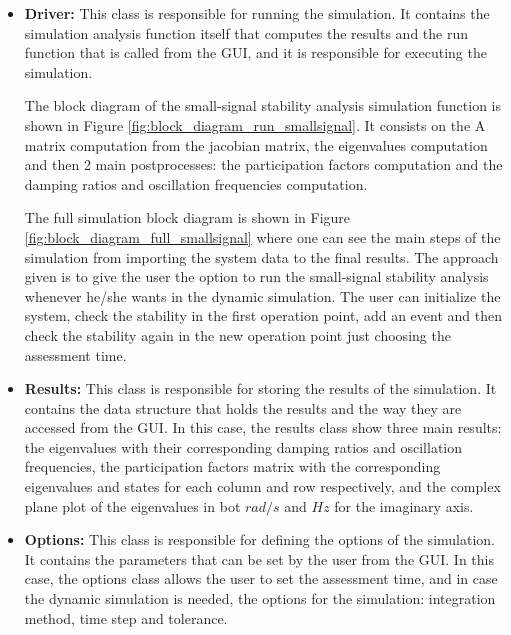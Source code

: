 \begin{itemize}
    \item \textbf{Driver:} This class is responsible for running the simulation. It contains the simulation analysis function itself
    that computes the results and the run function that is called from the GUI, and it is responsible for executing the simulation.

    The block diagram of the small-signal stability analysis simulation function is shown in Figure \ref{fig:block_diagram_run_smallsignal}. 
    It consists on the A matrix computation from the jacobian matrix, the eigenvalues computation and then 2 main postprocesses: the participation factors
    computation and the damping ratios and oscillation frequencies computation. 
    
    The full simulation block diagram is shown in Figure \ref{fig:block_diagram_full_smallsignal} where one can see the main steps of the simulation from 
    importing the system data to the final results. The approach given is to give the user the option to run the small-signal stability analysis
    whenever he/she wants in the dynamic simulation. The user can initialize the system, check the stability in the first operation point, add an event and
    then check the stability again in the new operation point just choosing the assessment time.

    \item \textbf{Results:} This class is responsible for storing the results of the simulation. It contains the data structure that holds the results
    and the way they are accessed from the GUI. In this case, the results class show three main results: the eigenvalues with their corresponding damping ratios
    and oscillation frequencies, the participation factors matrix with the corresponding eigenvalues and states for each column and row respectively,
    and the complex plane plot of the eigenvalues in bot $rad/s$ and $Hz$ for the imaginary axis.

    \item \textbf{Options:} This class is responsible for defining the options of the simulation. It contains the parameters that can be set by the user
    from the GUI. In this case, the options class allows the user to set the assessment time, and in case the dynamic simulation is needed,
     the options for the simulation: integration method, time step and tolerance.
    
\end{itemize}

